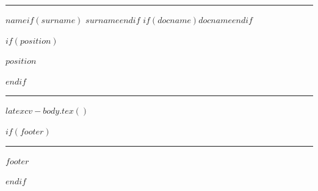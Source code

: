 \begingroup\color{softcol}\hrule\endgroup
\vspace{10pt}
\begin{center}
  \HUGE \textsc{$name$$if(surname)$ $surname$$endif$}%
  $if(docname)$\cvtitlerule\textsc{$docname$}$endif$
\end{center}

$if(position)$
\begin{center}
  \small\textsc{$position$}
\end{center}
$endif$

\vspace{4pt}
\begin{center}
  \footnotesize
  \renewcommand{\cvcontactsep}{\hspace{14pt}}
  \cvcontacts
\end{center}

\vspace{6pt}
\textcolor{softcol}{\hrule}
\vspace{4pt}

\normalsize

$latexcv-body.tex()$

$if(footer)$
\vspace{12pt}
\textcolor{softcol}{\hrule}
\vspace{4pt}
\begin{center}
  \footnotesize\textcolor{bgcol}{$footer$}
\end{center}
$endif$


